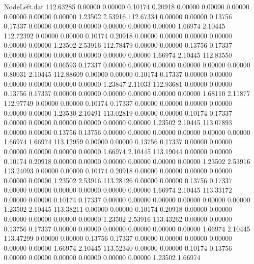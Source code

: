 \begin{filecontents}{NodeLeft.dat}
 112.63285    0.00000    0.00000     0.10174    0.20918    0.00000    0.00000    0.00000    0.00000    0.00000    0.00000    1.23502    2.53916
 112.67334    0.00000    0.00000     0.13756    0.17337    0.00000    0.00000    0.00000    0.00000    0.00000    0.00000    1.66974    2.10445
 112.72392    0.00000    0.00000     0.10174    0.20918    0.00000    0.00000    0.00000    0.00000    0.00000    0.00000    1.23502    2.53916
 112.78479    0.00000    0.00000     0.13756    0.17337    0.00000    0.00000    0.00000    0.00000    0.00000    0.00000    1.66974    2.10445
 112.83550    0.00000    0.00000     0.06593    0.17337    0.00000    0.00000    0.00000    0.00000    0.00000    0.00000    0.80031    2.10445
 112.88609    0.00000    0.00000     0.10174    0.17337    0.00000    0.00000    0.00000    0.00000    0.00000    0.00000    1.23847    2.11033
 112.93681    0.00000    0.00000     0.13756    0.17337    0.00000    0.00000    0.00000    0.00000    0.00000    0.00000    1.68110    2.11877
 112.97749    0.00000    0.00000     0.10174    0.17337    0.00000    0.00000    0.00000    0.00000    0.00000    0.00000    1.23530    2.10491
 113.02819    0.00000    0.00000     0.10174    0.17337    0.00000    0.00000    0.00000    0.00000    0.00000    0.00000    1.23502    2.10445
 113.07893    0.00000    0.00000     0.13756    0.13756    0.00000    0.00000    0.00000    0.00000    0.00000    0.00000    1.66974    1.66974
 113.12959    0.00000    0.00000     0.13756    0.17337    0.00000    0.00000    0.00000    0.00000    0.00000    0.00000    1.66974    2.10445
 113.19044    0.00000    0.00000     0.10174    0.20918    0.00000    0.00000    0.00000    0.00000    0.00000    0.00000    1.23502    2.53916
 113.24093    0.00000    0.00000     0.10174    0.20918    0.00000    0.00000    0.00000    0.00000    0.00000    0.00000    1.23502    2.53916
 113.28126    0.00000    0.00000     0.13756    0.17337    0.00000    0.00000    0.00000    0.00000    0.00000    0.00000    1.66974    2.10445
 113.33172    0.00000    0.00000     0.10174    0.17337    0.00000    0.00000    0.00000    0.00000    0.00000    0.00000    1.23502    2.10445
 113.38211    0.00000    0.00000     0.10174    0.20918    0.00000    0.00000    0.00000    0.00000    0.00000    0.00000    1.23502    2.53916
 113.43262    0.00000    0.00000     0.13756    0.17337    0.00000    0.00000    0.00000    0.00000    0.00000    0.00000    1.66974    2.10445
 113.47299    0.00000    0.00000     0.13756    0.17337    0.00000    0.00000    0.00000    0.00000    0.00000    0.00000    1.66974    2.10445
 113.52340    0.00000    0.00000     0.10174    0.13756    0.00000    0.00000    0.00000    0.00000    0.00000    0.00000    1.23502    1.66974

\end{filecontents}
